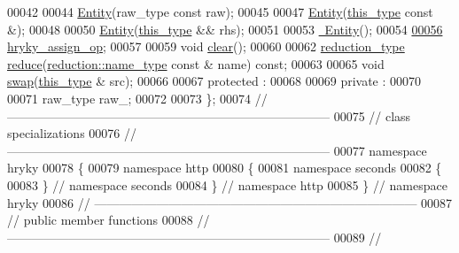 \begin{DoxyCode}
00042 
00044     \hyperlink{classhryky_1_1http_1_1seconds_1_1_entity_a932fb5a36c730e4192ee5e87708d46ee}{Entity}(raw\_type \textcolor{keyword}{const} raw);
00045 
00047     \hyperlink{classhryky_1_1http_1_1seconds_1_1_entity_a932fb5a36c730e4192ee5e87708d46ee}{Entity}(\hyperlink{classhryky_1_1http_1_1seconds_1_1_entity}{this_type} \textcolor{keyword}{const} &);
00048 
00050     \hyperlink{classhryky_1_1http_1_1seconds_1_1_entity_a932fb5a36c730e4192ee5e87708d46ee}{Entity}(\hyperlink{classhryky_1_1http_1_1seconds_1_1_entity}{this_type} && rhs);
00051 
00053     \hyperlink{classhryky_1_1http_1_1seconds_1_1_entity_a80eaea4353c48d3385378016f20069d8}{~Entity}();
00054 
\hypertarget{http__seconds__entity_8h_source_l00056}{}\hyperlink{classhryky_1_1http_1_1seconds_1_1_entity_addf62178d9ac1df309800eaeef020372}{00056}     \hyperlink{classhryky_1_1http_1_1seconds_1_1_entity_addf62178d9ac1df309800eaeef020372}{hryky_assign_op};
00057 
00059     \textcolor{keywordtype}{void} \hyperlink{classhryky_1_1http_1_1seconds_1_1_entity_a7307f57b5b5ddef286e1d2929cb01cf9}{clear}();
00060 
00062     \hyperlink{classhryky_1_1_intrusive_ptr}{reduction_type} \hyperlink{classhryky_1_1http_1_1seconds_1_1_entity_a3f4efe0188f6c81e708f81fcde7cf679}{reduce}(\hyperlink{classhryky_1_1reduction_1_1_string}{reduction::name_type} \textcolor{keyword}{const} & name) \textcolor{keyword}{const};
00063 
00065     \textcolor{keywordtype}{void} \hyperlink{classhryky_1_1http_1_1seconds_1_1_entity_aa6355c63a409960c53ffc609ae466967}{swap}(\hyperlink{classhryky_1_1http_1_1seconds_1_1_entity}{this_type} & src);
00066 
00067 \textcolor{keyword}{protected} :
00068 
00069 \textcolor{keyword}{private} :
00070 
00071     raw\_type raw\_;
00072 
00073 \};
00074 \textcolor{comment}{//
      ------------------------------------------------------------------------------}
00075 \textcolor{comment}{// class specializations}
00076 \textcolor{comment}{//
      ------------------------------------------------------------------------------}
00077 \textcolor{keyword}{namespace }hryky
00078 \{
00079 \textcolor{keyword}{namespace }http
00080 \{
00081 \textcolor{keyword}{namespace }seconds
00082 \{
00083 \} \textcolor{comment}{// namespace seconds}
00084 \} \textcolor{comment}{// namespace http}
00085 \} \textcolor{comment}{// namespace hryky}
00086 \textcolor{comment}{//
      ------------------------------------------------------------------------------}
00087 \textcolor{comment}{// public member functions}
00088 \textcolor{comment}{//
      ------------------------------------------------------------------------------}
00089 \textcolor{comment}{//
}
\end{DoxyCode}
